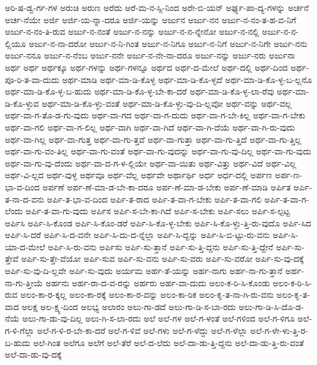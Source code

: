{ಅರಿ-ಷ-ಡ್ವ-ರ್ಗ-ಗಳ
ಅರುಚಿ
ಅರುಣ
ಅರೆದು
ಅರೆ-ಮ-ನ-ಸ್ಸಿ-ನಿಂದ
ಅರೇ-ಬಿ-ಯನ್
ಅರ್ಘ್ಯ-ಪಾ-ದ್ಯ-ಗಳನ್ನು
ಅರ್ಚನೆ
ಅರ್ಚ-ನೆಯೇ
ಅರ್ಜಿ
ಅರ್ಜಿ-ಯ-ನ್ನಾ-ದರೂ
ಅರ್ಜಿ-ಯನ್ನು
ಅರ್ಜುನ
ಅರ್ಜು-ನನ
ಅರ್ಜು-ನ-ನಂ-ತ-ಹ-ವ-ನಿಗೆ
ಅರ್ಜು-ನ-ನಂ-ತಿ-ರುವ
ಅರ್ಜು-ನ-ನಂತೆ
ಅರ್ಜು-ನ-ನನ್ನು
ಅರ್ಜು-ನ-ನ-ನ್ನೇನೋ
ಅರ್ಜು-ನ-ನಲ್ಲಿ
ಅರ್ಜು-ನ-ನ-ಲ್ಲಿಯೂ
ಅರ್ಜು-ನ-ನಾ-ದರೋ
ಅರ್ಜು-ನ-ನಿ-ಗಿಂತ
ಅರ್ಜು-ನ-ನಿಗೂ
ಅರ್ಜು-ನ-ನಿಗೆ
ಅರ್ಜು-ನ-ನಿಗೇ
ಅರ್ಜು-ನನು
ಅರ್ಜು-ನನೂ
ಅರ್ಜು-ನ-ನೆಂಬ
ಅರ್ಜು-ನನೇ
ಅರ್ಜು-ನ-ನೇ-ನಾ-ದರೂ
ಅರ್ಜು-ನನ್ನು
ಅರ್ಜು-ನರು
ಅರ್ಜುನಾ
ಅರ್ಥ
ಅರ್ಥ
ಅರ್ಥಕ್ಕೂ
ಅರ್ಥ-ಗಳನ್ನು
ಅರ್ಥ-ಗಳನ್ನೂ
ಅರ್ಥದ
ಅರ್ಥ-ದ-ಮೇಲೆ
ಅರ್ಥ-ದಲ್ಲಿ
ಅರ್ಥ-ದಿಂದ
ಅರ್ಥ-ಪೂ-ರಿ-ತ-ವಾ-ದುದು
ಅರ್ಥ-ಮಾಡಿ
ಅರ್ಥ-ಮಾ-ಡಿ-ಕೊಳ್ಳ
ಅರ್ಥ-ಮಾ-ಡಿ-ಕೊ-ಳ್ಳದೆ
ಅರ್ಥ-ಮಾ-ಡಿ-ಕೊ-ಳ್ಳ-ಬ-ಲ್ಲನೊ
ಅರ್ಥ-ಮಾ-ಡಿ-ಕೊ-ಳ್ಳ-ಬ-ಹುದು
ಅರ್ಥ-ಮಾ-ಡಿ-ಕೊ-ಳ್ಳ-ಬೇ-ಕಾ-ದರೆ
ಅರ್ಥ-ಮಾ-ಡಿ-ಕೊ-ಳ್ಳ-ಲಾ-ರೆವು
ಅರ್ಥ-ಮಾ-ಡಿ-ಕೊ-ಳ್ಳುವ
ಅರ್ಥ-ಮಾ-ಡಿ-ಕೊ-ಳ್ಳು-ವಂತೆ
ಅರ್ಥ-ಮಾ-ಡಿ-ಕೊ-ಳ್ಳು-ವು-ದಿ-ಲ್ಲವೋ
ಅರ್ಥ-ವನ್ನು
ಅರ್ಥ-ವಲ್ಲ
ಅರ್ಥ-ವಾ-ಗ-ತೊ-ಡ-ಗು-ವುದು
ಅರ್ಥ-ವಾ-ಗದ
ಅರ್ಥ-ವಾ-ಗ-ದುದು
ಅರ್ಥ-ವಾ-ಗ-ಬೇ-ಕಿಲ್ಲ
ಅರ್ಥ-ವಾ-ಗ-ಬೇಕು
ಅರ್ಥ-ವಾ-ಗಲಿ
ಅರ್ಥ-ವಾ-ಗ-ಲಿಲ್ಲ
ಅರ್ಥ-ವಾಗಿ
ಅರ್ಥ-ವಾ-ಗಿದೆ
ಅರ್ಥ-ವಾ-ಗಿ-ದೆಯೆ
ಅರ್ಥ-ವಾ-ಗಿ-ರು-ವುದು
ಅರ್ಥ-ವಾ-ಗಿಲ್ಲ
ಅರ್ಥ-ವಾ-ಗುತ್ತ
ಅರ್ಥ-ವಾ-ಗು-ತ್ತವೆ
ಅರ್ಥ-ವಾ-ಗುತ್ತಾ
ಅರ್ಥ-ವಾ-ಗು-ತ್ತಿದೆ
ಅರ್ಥ-ವಾ-ಗು-ತ್ತಿಲ್ಲ
ಅರ್ಥ-ವಾ-ಗು-ವಂ-ತಿಲ್ಲ
ಅರ್ಥ-ವಾ-ಗು-ವಂತೆ
ಅರ್ಥ-ವಾ-ಗು-ವುದನ್ನು
ಅರ್ಥ-ವಾ-ಗು-ವು-ದಿಲ್ಲ
ಅರ್ಥ-ವಾ-ಗು-ವುದು
ಅರ್ಥ-ವಾ-ಗು-ವು-ದೆಂದು
ಅರ್ಥ-ವಾ-ದ-ಗ-ಳ-ಲ್ಲಿಯೇ
ಅರ್ಥ-ವಾ-ಯಿತು
ಅರ್ಥ-ವಿತ್ತು
ಅರ್ಥ-ವಿದೆ
ಅರ್ಥ-ವಿಲ್ಲ
ಅರ್ಥ-ವಿ-ಲ್ಲದ
ಅರ್ಥ-ವುಳ್ಳ
ಅರ್ಥವೂ
ಅರ್ಥ-ವೆಲ್ಲ
ಅರ್ಥವೇ
ಅರ್ಥಾರ್ಥಿ
ಅರ್ಧ
ಅರ್ಧ-ದಲ್ಲಿ
ಅರ್ಪಣ
ಅರ್ಪ-ಣ-ಭಾ-ವ-ದಿಂದ
ಅರ್ಪಣೆ
ಅರ್ಪ-ಣೆ-ಮಾ-ಡ-ಬೇ-ಕಾ-ದರೂ
ಅರ್ಪ-ಣೆ-ಮಾ-ಡ-ಬೇಕು
ಅರ್ಪ-ಣೆ-ಮಾಡಿ
ಅರ್ಪಿತ
ಅರ್ಪಿ-ತ-ನಾ-ದ-ವನು
ಅರ್ಪಿ-ತ-ಭಾ-ವ-ದಿಂದ
ಅರ್ಪಿ-ತ-ರಾದ
ಅರ್ಪಿ-ತ-ವಾ-ಗ-ಬೇಕು
ಅರ್ಪಿ-ತ-ವಾ-ಗಲಿ
ಅರ್ಪಿ-ತ-ವಾ-ಗ-ಲೆಂದು
ಅರ್ಪಿ-ತ-ವಾ-ಗು-ವುದು
ಅರ್ಪಿಸ
ಅರ್ಪಿ-ಸ-ಬೇ-ಕಾ-ಗಿದೆ
ಅರ್ಪಿ-ಸ-ಬೇಕು
ಅರ್ಪಿ-ಸಲು
ಅರ್ಪಿ-ಸ-ಲ್ಪಟ್ಟ
ಅರ್ಪಿಸಿ
ಅರ್ಪಿ-ಸಿ-ಕೊಂಡ
ಅರ್ಪಿ-ಸಿ-ಕೊಂ-ಡರೆ
ಅರ್ಪಿ-ಸಿ-ಕೊ-ಳ್ಳ-ಬೇಕು
ಅರ್ಪಿ-ಸಿ-ಕೊ-ಳ್ಳು-ತ್ತಿ-ರು-ವುದೊ
ಅರ್ಪಿ-ಸಿದ
ಅರ್ಪಿ-ಸಿ-ದರೆ
ಅರ್ಪಿ-ಸಿ-ದ-ವನೇ
ಅರ್ಪಿ-ಸಿ-ದು-ದ-ನ್ನೆಲ್ಲಾ
ಅರ್ಪಿ-ಸಿ-ದ್ದನ್ನು
ಅರ್ಪಿ-ಸಿ-ಬಿ-ಟ್ಟು-ರು-ವನು
ಅರ್ಪಿ-ಸಿ-ಯಾ-ದ-ಮೇಲೆ
ಅರ್ಪಿ-ಸಿ-ರು-ವನು
ಅರ್ಪಿಸು
ಅರ್ಪಿ-ಸು-ತ್ತಾನೆ
ಅರ್ಪಿ-ಸು-ತ್ತಿ-ದ್ದನು
ಅರ್ಪಿ-ಸು-ತ್ತಿ-ದ್ದೇನೆ
ಅರ್ಪಿ-ಸು-ತ್ತೇವೆ
ಅರ್ಪಿ-ಸು-ತ್ತೇ-ವೆಯೋ
ಅರ್ಪಿ-ಸುವ
ಅರ್ಪಿ-ಸು-ವನು
ಅರ್ಪಿ-ಸು-ವರು
ಅರ್ಪಿ-ಸು-ವರೋ
ಅರ್ಪಿ-ಸು-ವು-ದಕ್ಕೆ
ಅರ್ಪಿ-ಸು-ವು-ದಿ-ಲ್ಲವೇ
ಅರ್ಪಿ-ಸು-ವುದು
ಅರ್ಯಮ
ಅರ್ಹ-ತೆ-ಯನ್ನು
ಅರ್ಹ-ನಾಗು
ಅರ್ಹ-ನಾ-ಗು-ತ್ತಾನೆ
ಅರ್ಹ-ನಾ-ಗು-ತ್ತೀಯೆ
ಅರ್ಹನು
ಅರ್ಹ-ರಾ-ದ-ವ-ರನ್ನು
ಅರ್ಹರು
ಅರ್ಹ-ವಾ-ದುದು
ಅಲಂ-ಕ-ರಿ-ಸಿ-ಕೊಂಡು
ಅಲಂ-ಕ-ರಿ-ಸಿ-ರುವ
ಅಲಂ-ಕಾ-ರ-ಕ್ಕಲ್ಲ
ಅಲಂ-ಕಾ-ರಕ್ಕೆ
ಅಲಂ-ಕಾ-ರ-ವನ್ನು
ಅಲಂ-ಕಾ-ರಿಕ
ಅಲಂ-ಕೃ-ತ-ನಾ-ಗಿ-ರು-ವನು
ಅಲಂ-ಕೃ-ತ-ವಾದ
ಅಲಕ್ಷ
ಅಲ-ಕ್ಷ್ಯ-ದಿಂದ
ಅಲಭ್ಯ
ಅಲಾರಂ
ಅಲು-ಗಾ-ಡದೆ
ಅಲು-ಗಾ-ಡಿ-ಸ-ಬಾ-ರದು
ಅಲು-ಗಾ-ಡಿ-ಸಿ-ದೊ-ಡ-ನೆಯೆ
ಅಲು-ಗಾ-ಡು-ವು-ದಿಲ್ಲ
ಅಲು-ಗಿ-ಸ-ಲಾ-ರದು
ಅಲೆ
ಅಲೆ-ಗಳ
ಅಲೆ-ಗ-ಳಂತೆ
ಅಲೆ-ಗಳಿಂದ
ಅಲೆ-ಗ-ಳಿಗೂ
ಅಲೆ-ಗ-ಳಿ-ಗೆಲ್ಲಾ
ಅಲೆ-ಗ-ಳಿ-ರ-ಬೇ-ಕಾ-ದರೆ
ಅಲೆ-ಗ-ಳಿವೆ
ಅಲೆ-ಗಳು
ಅಲೆ-ಗ-ಳೆದ್ದು
ಅಲೆ-ಗ-ಳೆಲ್ಲಾ
ಅಲೆ-ಗ-ಳೇ-ಳು-ತ್ತಿ-ರ-ಬ-ಹುದು
ಅಲೆ-ಗಿಂತ
ಅಲೆಗೂ
ಅಲೆಗೆ
ಅಲೆ-ತೆರೆ
ಅಲೆ-ದ-ಲೆದು
ಅಲೆ-ದಾ-ಡು-ತ್ತಿ-ದ್ದನು
ಅಲೆ-ದಾ-ಡು-ತ್ತಿ-ರು-ವಂತೆ
ಅಲೆ-ದಾ-ಡು-ವು-ದಕ್ಕೆ
}

